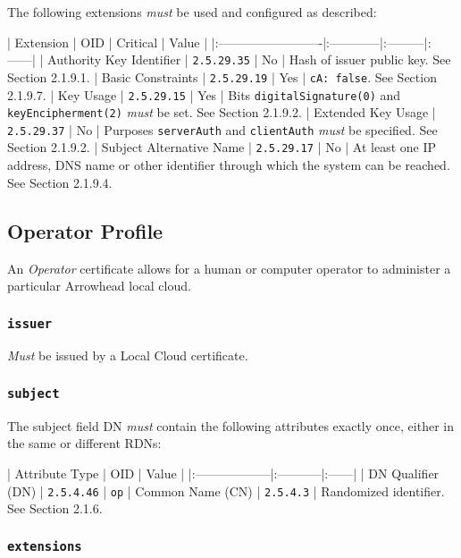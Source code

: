 The following extensions \textit{must} be used and configured as described:

| Extension                | OID         | Critical | Value |
|:-------------------------|:------------|:---------|:------|
| Authority Key Identifier | \texttt{2.5.29.35} | No       | Hash of issuer public key. See Section 2.1.9.1.
| Basic Constraints        | \texttt{2.5.29.19} | Yes      | \texttt{cA: false}. See Section 2.1.9.7.
| Key Usage                | \texttt{2.5.29.15} | Yes      | Bits \texttt{digitalSignature(0)} and \texttt{keyEncipherment(2)} \textit{must} be set. See Section 2.1.9.2.
| Extended Key Usage       | \texttt{2.5.29.37} | No       | Purposes \texttt{serverAuth} and \texttt{clientAuth} \textit{must} be specified. See Section 2.1.9.2.
| Subject Alternative Name | \texttt{2.5.29.17} | No       | At least one IP address, DNS name or other identifier through which the system can be reached. See Section 2.1.9.4.

\subsection{Operator Profile}

An \textit{Operator} certificate allows for a human or computer operator to administer a particular Arrowhead local cloud.

\subsubsection{\texttt{issuer}}

\textit{Must} be issued by a Local Cloud certificate.

\subsubsection{\texttt{subject}}

The subject field DN \textit{must} contain the following attributes exactly once, either in the same or different RDNs:

| Attribute Type    | OID        | Value |
|:------------------|:-----------|:------|
| DN Qualifier (DN) | \texttt{2.5.4.46} | \texttt{op}
| Common Name (CN)  | \texttt{2.5.4.3}  | Randomized identifier. See Section 2.1.6.

\subsubsection{\texttt{extensions}}

